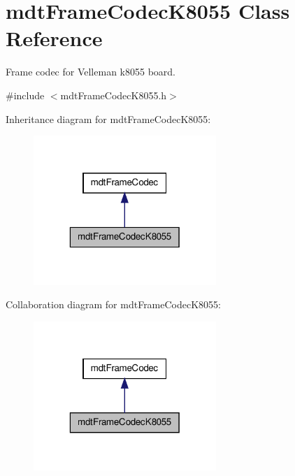 \hypertarget{classmdt_frame_codec_k8055}{
\section{mdtFrameCodecK8055 Class Reference}
\label{classmdt_frame_codec_k8055}
}


Frame codec for Velleman k8055 board.  




{\ttfamily \#include $<$mdtFrameCodecK8055.h$>$}



Inheritance diagram for mdtFrameCodecK8055:\nopagebreak
\begin{figure}[H]
\begin{center}
\leavevmode
\includegraphics[width=196pt]{classmdt_frame_codec_k8055__inherit__graph}
\end{center}
\end{figure}


Collaboration diagram for mdtFrameCodecK8055:\nopagebreak
\begin{figure}[H]
\begin{center}
\leavevmode
\includegraphics[width=196pt]{classmdt_frame_codec_k8055__coll__graph}
\end{center}
\end{figure}
